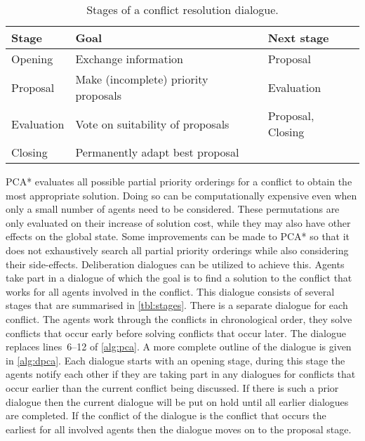 \begin{table}
    \centering
    \caption{Stages of a conflict resolution dialogue.}
    \label{tbl:stages}
    \begin{tabular}{l|l|l}
        Stage & Goal & Next stage \\ \hline
        Opening & Exchange information & Proposal \\
        Proposal & Make (incomplete) priority proposals & Evaluation \\
        Evaluation & Vote on suitability of proposals & Proposal, Closing \\
        Closing & Permanently adapt best proposal & \\
    \end{tabular}
\end{table}

PCA* evaluates all possible partial priority orderings for a conflict to obtain 
the most appropriate solution. Doing so can be computationally expensive even 
when only a small number of agents need to be considered. These permutations 
are only evaluated on their increase of solution cost, while they may also have 
other effects on the global state. Some improvements can be made to PCA* so 
that it does not exhaustively search all partial priority orderings while also 
considering their side-effects. Deliberation dialogues can be utilized to 
achieve this.
Agents take part in a dialogue of which the goal is to find a solution to the
conflict that works for all agents involved in the conflict. This dialogue
consists of several stages that are summarised in \autoref{tbl:stages}. There 
is a separate dialogue for each conflict. The agents work through the
conflicts in chronological order, they solve conflicts that occur early before
solving conflicts that occur later. The dialogue replaces lines~6--12 of 
\autoref{alg:pca}. A more complete outline of the dialogue is given in 
\autoref{alg:dpca}.
Each dialogue starts with an opening stage, during this stage the agents notify 
each other if they are taking part
in any dialogues for conflicts that occur earlier than the current conflict
being discussed. If there is such a prior dialogue then the current dialogue
will be put on hold until all earlier dialogues are completed. If the conflict 
of the dialogue is the conflict that occurs the earliest for all involved 
agents then the dialogue moves on to the proposal stage.

